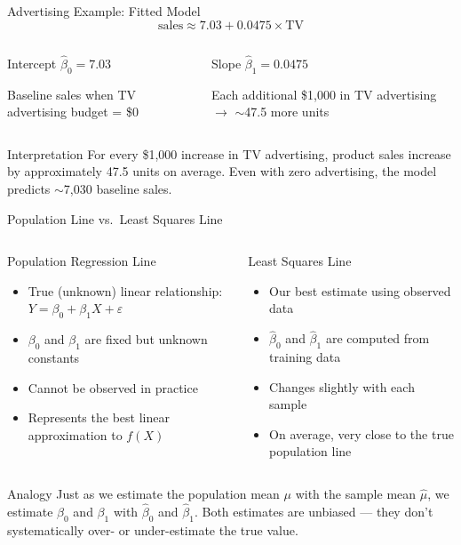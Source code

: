 \documentclass[ignorenonframetext,]{beamer}
\begin{document}
\begin{frame}{Advertising Example: Fitted Model}
$$\text{sales} \approx 7.03 + 0.0475 \times \text{TV}$$
\begin{columns}[T]
\begin{block}{Intercept}
\centering
$\hat\beta_0 = 7.03$

\small Baseline sales when TV advertising budget = \$0
\end{block}
\begin{block}{Slope}
\centering
$\hat\beta_1 = 0.0475$

\small Each additional \$1,000 in TV advertising $\rightarrow$ $\sim$47.5 more units
\end{block}
\end{columns}

\begin{exampleblock}{Interpretation}
For every \$1,000 increase in TV advertising, product sales increase by approximately 47.5 units on average. Even with zero advertising, the model predicts $\sim$7,030 baseline sales.
\end{exampleblock}
\end{frame}

\begin{frame}{Population Line vs.\ Least Squares Line}
\begin{columns}[T]
\begin{block}{Population Regression Line}
\small
\begin{itemize}
\item True (unknown) linear relationship: $Y = \beta_0 + \beta_1 X + \varepsilon$
\item $\beta_0$ and $\beta_1$ are fixed but unknown constants
\item Cannot be observed in practice
\item Represents the best linear approximation to $f(X)$
\end{itemize}
\end{block}
\begin{block}{Least Squares Line}
\small
\begin{itemize}
\item Our best estimate using observed data
\item $\hat\beta_0$ and $\hat\beta_1$ are computed from training data
\item Changes slightly with each sample
\item On average, very close to the true population line
\end{itemize}
\end{block}
\end{columns}

\begin{alertblock}{Analogy}
\small
Just as we estimate the population mean $\mu$ with the sample mean $\hat\mu$, we estimate $\beta_0$ and $\beta_1$ with $\hat\beta_0$ and $\hat\beta_1$. Both estimates are unbiased --- they don't systematically over- or under-estimate the true value.
\end{alertblock}
\end{frame}
\end{document}
